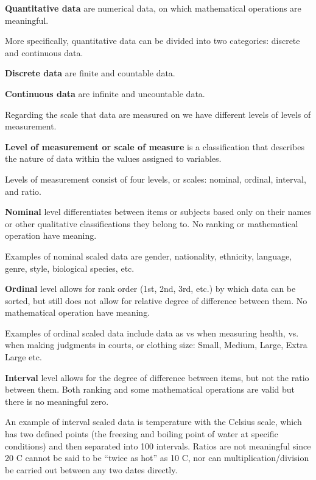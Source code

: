 \textbf{Quantitative data} are numerical data, on which mathematical operations are meaningful.
\ed

More specifically, quantitative data can be divided into two categories: discrete and continuous data.

\textbf{Discrete data} are finite and countable data.
\ed

\textbf{Continuous data} are infinite and uncountable data.
\ed

Regarding the scale that data are measured on we have different levels of levels of measurement.

\textbf{Level of measurement or scale of measure} is a classification that describes the nature of data within the
values assigned to variables.
\ed

Levels of measurement consist of four levels, or scales: nominal, ordinal, interval, and ratio.

\bd[Nominal]
\textbf{Nominal} level differentiates between items or subjects based only on their names or other qualitative
classifications they belong to. No ranking or mathematical operation have meaning.
\ed

Examples of nominal scaled data are gender, nationality, ethnicity, language, genre, style, biological species, etc.

\bd[Ordinal]
\textbf{Ordinal} level allows for rank order (1st, 2nd, 3rd, etc.) by which data can be sorted, but still does not
allow for relative degree of difference between them. No mathematical operation have meaning.
\ed

Examples of ordinal scaled data include data as  vs  when measuring health,  vs.
 when making judgments in courts, or clothing size: Small, Medium, Large, Extra Large etc.

\bd[Interval]
\textbf{Interval} level allows for the degree of difference between items, but not the ratio between them. Both
ranking and some mathematical operations are valid but there is no meaningful zero.
\ed

An example of interval scaled data is temperature with the Celsius scale, which has two defined points (the freezing
and boiling point of water at specific conditions) and then separated into 100 intervals. Ratios are not meaningful
since 20 \textdegree{}C cannot be said to be ``twice as hot'' as 10 \textdegree{}C, nor can multiplication/division be
carried out between any two dates directly.

